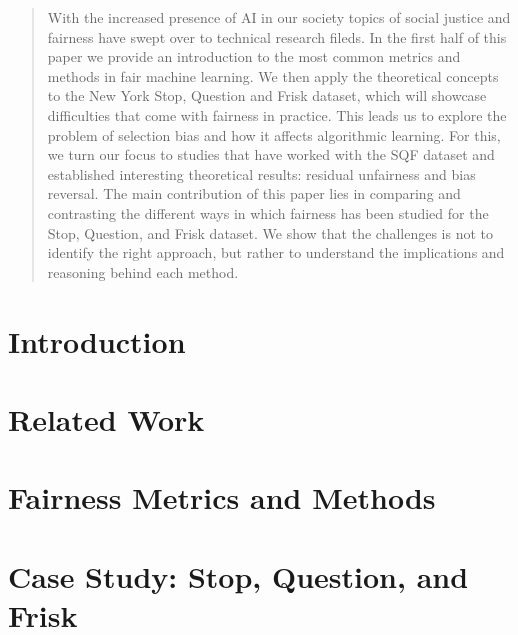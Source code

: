 \documentclass[12pt]{article}
\begin{document}
\newpage
\begin{abstract}

With the increased presence of AI in our society topics of social justice and fairness have swept over to technical research fileds. In the first half of this paper we provide an introduction to the most common metrics and methods in fair machine learning. We then apply the theoretical concepts to the New York Stop, Question and Frisk dataset, which will showcase difficulties that come with fairness in practice.
This leads us to explore the problem of selection bias and how it affects algorithmic learning. For this, we turn our focus to studies that have worked with the SQF dataset and established interesting theoretical results: residual unfairness and bias reversal.
The main contribution of this paper lies in comparing and contrasting the different ways in which fairness has been studied for the Stop, Question, and Frisk dataset. We show that the challenges is not to identify the right approach, but rather to understand the implications and reasoning behind each method.

\end{abstract}


\newpage
\tableofcontents
\newpage



    
\section{Introduction}

\newpage
\section{Related Work}
\newpage

\section{Fairness Metrics and Methods}
\label{sec:fairness_metrics_methods}


\newpage
\section{Case Study: Stop, Question, and Frisk}
\label{sec:case_study}

\newpage
\end{document}
